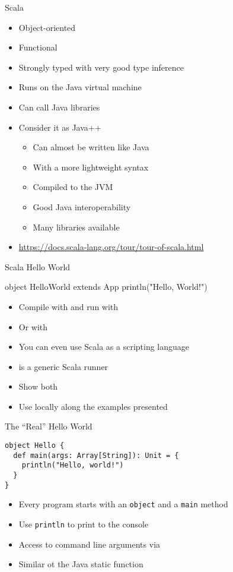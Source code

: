 \begin{frame}[fragile]{Scala}
\begin{itemize}
\item Object-oriented
\item Functional
\item Strongly typed with very good type inference
\item Runs on the Java virtual machine
\item Can call Java libraries
\item Consider it as Java++
\begin{itemize}
\item Can almost be written like Java
\item With a more lightweight syntax
\item Compiled to the JVM
\item Good Java interoperability
\item Many libraries available
\end{itemize}
\item \url{https://docs.scala-lang.org/tour/tour-of-scala.html}
\end{itemize}
\end{frame}

\begin{frame}[fragile]{Scala Hello World}
\begin{chisel}
object HelloWorld extends App {
  println("Hello, World!")
}
\end{chisel}
\begin{itemize}
\item Compile with  and run with 
\item Or with 
\item You can even use Scala as a scripting language
\item {} is a generic Scala runner
\item Show both
\item Use  locally along the examples presented
\end{itemize}
\end{frame}

\begin{frame}[fragile]{The ``Real'' Hello World}

\begin{verbatim}
object Hello {
  def main(args: Array[String]): Unit = {
    println("Hello, world!")
  }
}
\end{verbatim}

\begin{itemize}
    \item Every program starts with an \texttt{object} and a \texttt{main} method
    \item Use \texttt{println} to print to the console
    \item Access to command line arguments via 
    \item Similar ot the Java static  function
\end{itemize}
\end{frame}

